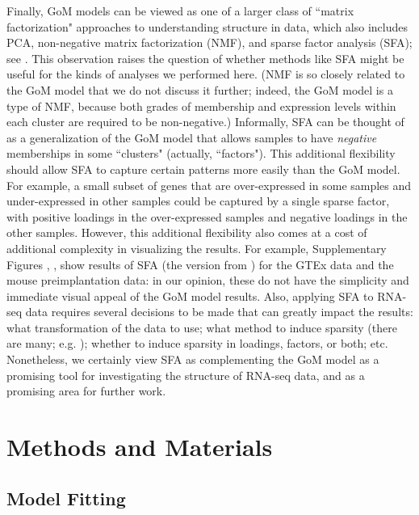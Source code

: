 \documentclass[10pt,letterpaper]{article}
\begin{document}
Finally, GoM models can be viewed as one of a larger class of ``matrix factorization" approaches to understanding structure in data, which also includes PCA, non-negative matrix factorization (NMF), and sparse factor analysis (SFA); see \cite{Engelhardt2010}. This observation raises the question of whether methods like SFA might be useful for the kinds of analyses we performed here. (NMF is so closely related to the GoM model that we do not discuss it further;
indeed, the GoM model is a type of NMF, because both grades of membership and expression levels within each cluster are required to be non-negative.)
Informally, SFA can be thought of as a generalization of the GoM model that allows samples to have {\it negative} memberships in some ``clusters" (actually, ``factors").
This additional flexibility should allow SFA to capture certain patterns more easily than the GoM model. For example, a small subset of genes that are over-expressed in some samples and under-expressed in other samples could be captured by a single sparse factor, with positive loadings in the over-expressed samples and negative loadings in the other samples. However, this additional flexibility also comes at a cost of additional complexity in visualizing the results. For example, Supplementary Figures , ,  show results of SFA (the version from \cite{Engelhardt2010}) for the GTEx data and the mouse preimplantation data: in our opinion, these do not have the
simplicity and immediate visual appeal of the GoM model results. Also, applying SFA to RNA-seq data requires
several decisions to be made that can greatly impact the results: what transformation of the data to use; what method to induce sparsity (there are many; e.g. \cite{Lopes2004, Bhattacharya2011, Engelhardt2010, Witten2009});  whether to induce sparsity in loadings, factors, or both; etc. Nonetheless, we certainly view SFA as complementing the GoM model as a promising
tool for investigating the structure of RNA-seq data, and as a promising area for further work.





\section*{Methods and Materials}

\subsection*{Model Fitting}
\end{document}
